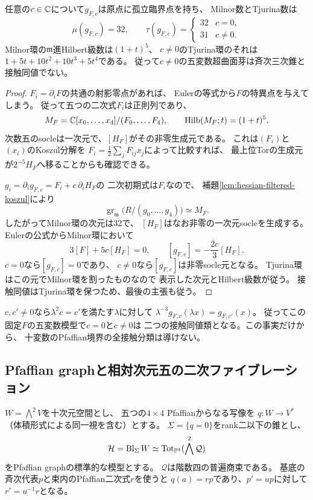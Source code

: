 \begin{proposition}[Hessian摂動のMilnor数とTjurina数]
\label{prop:hessian-milnor-tjurina}
任意の$c\in\mathbb C$について$g_{F,c}$は原点に孤立臨界点を持ち、
Milnor数とTjurina数は
\[
 \mu(g_{F,c})=32,\qquad
 \tau(g_{F,c})=
 \begin{cases}32&c=0,\\31&c\ne0.\end{cases}
\]
Milnor環の$\mathfrak m$進Hilbert級数は$(1+t)^5$、
$c\ne0$のTjurina環のそれは
$1+5t+10t^2+10t^3+5t^4$である。
従って$c\ne0$の五変数超曲面芽は斉次三次錐と
接触同値でない。
\end{proposition}
\begin{proof}
$F_i=\partial_iF$の共通の射影零点があれば、
Eulerの等式から$F$の特異点を与えてしまう。
従って五つの二次式$F_i$は正則列であり、
\[
 M_F=\mathbb C[x_0,\ldots,x_4]/(F_0,\ldots,F_4),\qquad
 \operatorname{Hilb}(M_F;t)=(1+t)^5.
\]
次数五のsocleは一次元で、$[H_F]$がその非零生成元である。
これは$(F_i)$と$(x_i)$のKoszul分解を
$F_i=\frac12\sum_jF_{ij}x_j$によって比較すれば、
最上位Torの生成元が$2^{-5}H_F$へ移ることからも確認できる。

$g_i=\partial_i g_{F,c}=F_i+c\,\partial_iH_F$の
二次初期式は$F_i$なので、
補題\ref{lem:hessian-filtered-koszul}により
\[
 \operatorname{gr}_{\mathfrak m}
 \bigl(R/(g_0,\ldots,g_4)\bigr)\simeq M_F.
\]
したがってMilnor環の次元は32で、
$[H_F]$はなお非零の一次元socleを生成する。
Eulerの公式からMilnor環において
\[
 3[F]+5c[H_F]=0,\qquad
 [g_{F,c}]=-\frac{2c}{3}[H_F].
\]
$c=0$なら$[g_{F,c}]=0$であり、
$c\ne0$なら$[g_{F,c}]$は非零socle元となる。
Tjurina環はこの元でMilnor環を割ったものなので
表示した次元とHilbert級数が従う。
接触同値はTjurina環を保つため、最後の主張も従う。
\end{proof}

\begin{remark}[係数の二つの軌道]
$c,c'\ne0$なら$\lambda^2c=c'$を満たす$\lambda$に対して
$\lambda^{-3}g_{F,c}(\lambda x)=g_{F,c'}(x)$。
従ってこの固定$F$の五変数模型で$c=0$と$c\ne0$は
二つの接触同値類となる。この事実だけから、
十変数のPfaffian境界の全接触分類は導けない。
\end{remark}

\subsection{Pfaffian graphと相対次元五の二次ファイブレーション}
$W=\bigwedge^2V$を十次元空間とし、
五つの$4\times4$ Pfaffianからなる写像を
$q:W\to V^*$（体積形式による同一視を含む）とする。
$\Sigma=\{q=0\}$をrank二以下の錐とし、
\[
 {\cal H}=\operatorname{Bl}_{\Sigma}W
 \simeq \operatorname{Tot}_{\mathbb P^4}(\bigwedge^2\mathcal Q)
\]
をPfaffian graphの標準的な模型とする。
$\mathcal Q$は階数四の普遍商束である。
基底の斉次代表$p$と束内のPfaffian二次式$r$を使うと
$q(a)=rp$であり、$p'=up$に対して$r'=u^{-1}r$となる。


